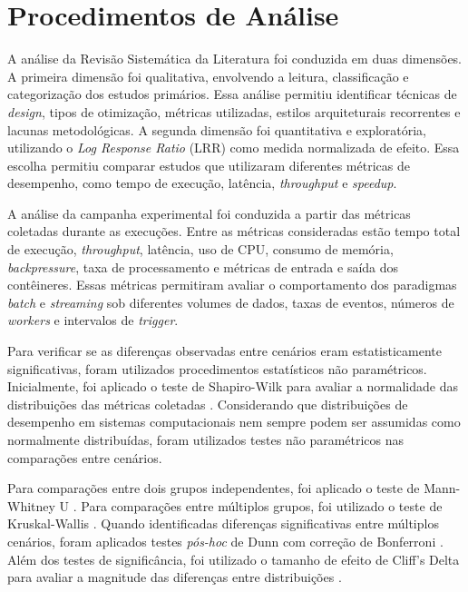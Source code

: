 \section{Procedimentos de Análise}
\label{sec:procedimentos-analise}

A análise da Revisão Sistemática da Literatura foi conduzida em duas dimensões. A primeira dimensão foi qualitativa, envolvendo a leitura, classificação e categorização dos estudos primários. Essa análise permitiu identificar técnicas de \textit{design}, tipos de otimização, métricas utilizadas, estilos arquiteturais recorrentes e lacunas metodológicas. A segunda dimensão foi quantitativa e exploratória, utilizando o \textit{Log Response Ratio} (LRR) como medida normalizada de efeito. Essa escolha permitiu comparar estudos que utilizaram diferentes métricas de desempenho, como tempo de execução, latência, \textit{throughput} e \textit{speedup}.

A análise da campanha experimental foi conduzida a partir das métricas coletadas durante as execuções. Entre as métricas consideradas estão tempo total de execução, \textit{throughput}, latência, uso de CPU, consumo de memória, \textit{backpressure}, taxa de processamento e métricas de entrada e saída dos contêineres. Essas métricas permitiram avaliar o comportamento dos paradigmas \textit{batch} e \textit{streaming} sob diferentes volumes de dados, taxas de eventos, números de \textit{workers} e intervalos de \textit{trigger}.

Para verificar se as diferenças observadas entre cenários eram estatisticamente significativas, foram utilizados procedimentos estatísticos não paramétricos. Inicialmente, foi aplicado o teste de Shapiro-Wilk para avaliar a normalidade das distribuições das métricas coletadas \cite{shapiro1965analysis}. Considerando que distribuições de desempenho em sistemas computacionais nem sempre podem ser assumidas como normalmente distribuídas, foram utilizados testes não paramétricos nas comparações entre cenários.

Para comparações entre dois grupos independentes, foi aplicado o teste de Mann-Whitney U \cite{mann1947test}. Para comparações entre múltiplos grupos, foi utilizado o teste de Kruskal-Wallis \cite{kruskal1952use}. Quando identificadas diferenças significativas entre múltiplos cenários, foram aplicados testes \textit{pós-hoc} de Dunn com correção de Bonferroni \cite{dunn1964multiple}. Além dos testes de significância, foi utilizado o tamanho de efeito de Cliff's Delta para avaliar a magnitude das diferenças entre distribuições \cite{cliff1993dominance}.

